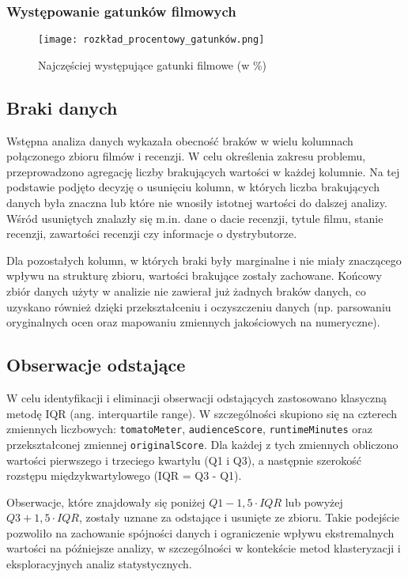 \documentclass[a4paper,12pt,titlepage]{article}
\begin{document}
\subsubsection*{Występowanie gatunków filmowych}

\begin{figure}[H]
    \centering
    \texttt{[image: rozkład\_procentowy\_gatunków.png]}
    \caption{Najczęściej występujące gatunki filmowe (w \%)}
    \label{fig:genres}
\end{figure}


\subsection{Braki danych}

Wstępna analiza danych wykazała obecność braków w wielu kolumnach połączonego zbioru filmów i recenzji. W celu określenia zakresu problemu, przeprowadzono agregację liczby brakujących wartości w każdej kolumnie. Na tej podstawie podjęto decyzję o usunięciu kolumn, w których liczba brakujących danych była znaczna lub które nie wnosiły istotnej wartości do dalszej analizy. Wśród usuniętych znalazły się m.in. dane o dacie recenzji, tytule filmu, stanie recenzji, zawartości recenzji czy informacje o dystrybutorze.

Dla pozostałych kolumn, w których braki były marginalne i nie miały znaczącego wpływu na strukturę zbioru, wartości brakujące zostały zachowane. Końcowy zbiór danych użyty w analizie nie zawierał już żadnych braków danych, co uzyskano również dzięki przekształceniu i oczyszczeniu danych (np. parsowaniu oryginalnych ocen oraz mapowaniu zmiennych jakościowych na numeryczne).

\subsection{Obserwacje odstające}

W celu identyfikacji i eliminacji obserwacji odstających zastosowano klasyczną metodę IQR (ang. interquartile range). W szczególności skupiono się na czterech zmiennych liczbowych: \texttt{tomatoMeter}, \texttt{audienceScore}, \texttt{runtimeMinutes} oraz przekształconej zmiennej \texttt{originalScore}. Dla każdej z tych zmiennych obliczono wartości pierwszego i trzeciego kwartylu (Q1 i Q3), a następnie szerokość rozstępu międzykwartylowego (IQR = Q3 - Q1).

Obserwacje, które znajdowały się poniżej $Q1 - 1{,}5 \cdot IQR$ lub powyżej $Q3 + 1{,}5 \cdot IQR$, zostały uznane za odstające i usunięte ze zbioru. Takie podejście pozwoliło na zachowanie spójności danych i ograniczenie wpływu ekstremalnych wartości na późniejsze analizy, w szczególności w kontekście metod klasteryzacji i eksploracyjnych analiz statystycznych.
\end{document}

